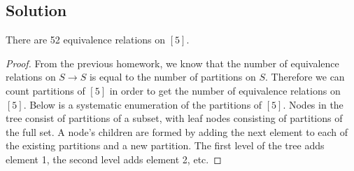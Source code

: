 \documentclass[12pt]{article}
\begin{document}
\subsection*{Solution}
There are 52 equivalence relations on $[5]$. 
\begin{proof}
From the previous homework, we know that the number of equivalence relations on $S \rightarrow S$ is equal to the number of partitions on $S$. Therefore we can count partitions of $[5]$ in order to get the number of equivalence relations on $[5]$. Below is a systematic enumeration of the partitions of $[5]$. Nodes in the tree consist of partitions of a subset, with leaf nodes consisting of partitions of the full set. A node's children are formed by adding the next element to each of the existing partitions and a new partition. The first level of the tree adds element 1, the second level adds element 2, etc.
\end{proof}
\end{document}
